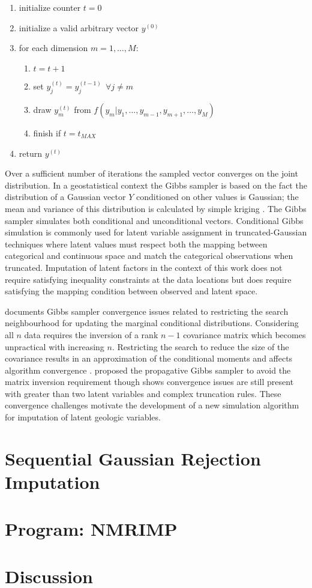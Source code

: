 \begin{enumerate}[noitemsep]
    \item initialize counter $t=0$
    \item initialize a valid arbitrary vector $y^{(0)}$
    \item for each dimension $m=1,\dots,M$:
          \begin{enumerate}
              \item $t=t+1$
              \item set $y^{(t)}_{j} = y^{(t-1)}_{j} \ \ \forall j \neq m$
              \item draw $y^{(t)}_{m}$ from  $f(y_{m}|y_{1},\dots,y_{m-1},y_{m+1},\dots,y_{M})$
              \item finish if $t=t_{MAX}$
          \end{enumerate}
    \item return $y^{(t)}$
\end{enumerate}

Over a sufficient number of iterations the sampled vector converges on the joint distribution. In a geostatistical context the Gibbs sampler is based on the fact the distribution of a Gaussian vector $Y$ conditioned on other values is Gaussian; the mean and variance of this distribution is calculated by simple kriging \citep{emery2014simulating}. The Gibbs sampler simulates both conditional and unconditional vectors. Conditional Gibbs simulation is commonly used for latent variable assignment in truncated-Gaussian techniques \citep{armstrong2011plurigaussian,silva2017multiple} where latent values must respect both the mapping between categorical and continuous space and match the categorical observations when truncated. Imputation of latent factors in the context of this work does not require satisfying inequality constraints at the data locations but does require satisfying the mapping condition between observed and latent space.

\cite{silva2018enhanced} documents Gibbs sampler convergence issues related to restricting the search neighbourhood for updating the marginal conditional distributions. Considering all $n$ data requires the inversion of a rank $n-1$ covariance matrix which becomes unpractical with increasing $n$. Restricting the search to reduce the size of the covariance results in an approximation of the conditional moments and affects algorithm convergence \citep{emery2014simulating, lauzon2020sequential}. \cite{lantuejoul2012simulation} proposed the propagative Gibbs sampler to avoid the matrix inversion requirement though \cite{silva2018enhanced} shows convergence issues are still present with greater than two latent variables and complex truncation rules. These convergence challenges motivate the development of a new simulation algorithm for imputation of latent geologic variables.


\FloatBarrier
\section{Sequential Gaussian Rejection Imputation}
\label{sec:sgri}


\FloatBarrier
\section{Program: NMRIMP}
\label{sec:nmrimp}


\FloatBarrier
\section{Discussion}
\label{sec:discuss05}